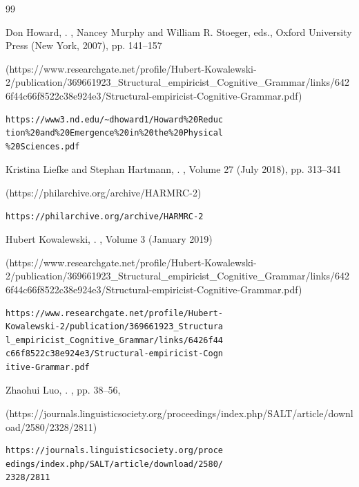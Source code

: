 \begin{thebibliography}{99}
{
Don Howard, 
.  
,
Nancey Murphy and William R. Stoeger, eds.,
Oxford University Press (New York, 2007), 
pp. 141--157
%
\begin{boxurl}(https://www.researchgate.net/profile/Hubert-Kowalewski-2/publication/369661923_Structural_empiricist_Cognitive_Grammar/links/6426f44c66f8522c38e924e3/Structural-empiricist-Cognitive-Grammar.pdf)
\begin{lstlisting}
https://www3.nd.edu/~dhoward1/Howard%20Reduc
tion%20and%20Emergence%20in%20the%20Physical
%20Sciences.pdf
\end{lstlisting}
\end{boxurl}




Kristina Liefke and Stephan Hartmann, 
.  
,
Volume 27 (July 2018),
pp. 313--341
%
\begin{boxurl}(https://philarchive.org/archive/HARMRC-2)
\begin{lstlisting}
https://philarchive.org/archive/HARMRC-2
\end{lstlisting}
\end{boxurl}








Hubert Kowalewski, 
.  
, 
Volume 3 (January 2019)
%
\begin{boxurl}(https://www.researchgate.net/profile/Hubert-Kowalewski-2/publication/369661923_Structural_empiricist_Cognitive_Grammar/links/6426f44c66f8522c38e924e3/Structural-empiricist-Cognitive-Grammar.pdf)
\begin{lstlisting}
https://www.researchgate.net/profile/Hubert-
Kowalewski-2/publication/369661923_Structura
l_empiricist_Cognitive_Grammar/links/6426f44
c66f8522c38e924e3/Structural-empiricist-Cogn
itive-Grammar.pdf
\end{lstlisting}
\end{boxurl}


Zhaohui Luo,
.
, pp. 38--56, 
%
\begin{boxurl}(https://journals.linguisticsociety.org/proceedings/index.php/SALT/article/download/2580/2328/2811)
\begin{lstlisting}
https://journals.linguisticsociety.org/proce
edings/index.php/SALT/article/download/2580/
2328/2811
\end{lstlisting}
\end{boxurl}



}
\end{thebibliography}
